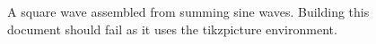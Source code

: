 \documentclass{article}
\begin{document}
\begin{figure}
  
  \caption{A square wave assembled from summing sine waves. Building this
  document should fail as it uses the tikzpicture environment.}
\end{figure}
\end{document}
